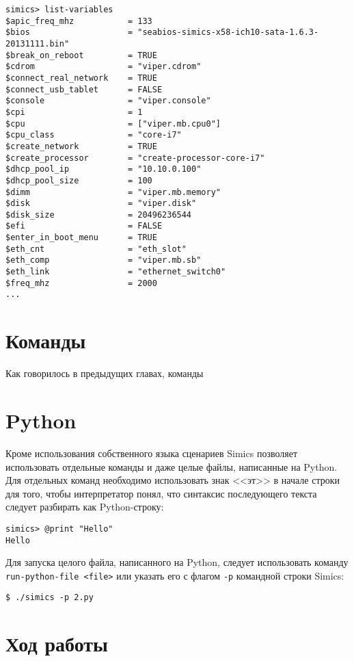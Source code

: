 \begin{lstlisting}
simics> list-variables
$apic_freq_mhz           = 133
$bios                    = "seabios-simics-x58-ich10-sata-1.6.3-20131111.bin"
$break_on_reboot         = TRUE
$cdrom                   = "viper.cdrom"
$connect_real_network    = TRUE
$connect_usb_tablet      = FALSE
$console                 = "viper.console"
$cpi                     = 1
$cpu                     = ["viper.mb.cpu0"]
$cpu_class               = "core-i7"
$create_network          = TRUE
$create_processor        = "create-processor-core-i7"
$dhcp_pool_ip            = "10.10.0.100"
$dhcp_pool_size          = 100
$dimm                    = "viper.mb.memory"
$disk                    = "viper.disk"
$disk_size               = 20496236544
$efi                     = FALSE
$enter_in_boot_menu      = TRUE
$eth_cnt                 = "eth_slot"
$eth_comp                = "viper.mb.sb"
$eth_link                = "ethernet_switch0"
$freq_mhz                = 2000
...
\end{lstlisting}

\section{Команды}

Как говорилось в предыдущих главах, команды 

\todo

\section{Python}

Кроме использования собственного языка сценариев Simics позволяет использовать отдельные команды и даже целые файлы, написанные на Python. Для отдельных команд необходимо использовать знак <<эт>>  в начале строки для того, чтобы интерпретатор понял, что синтаксис последующего текста следует разбирать как Python-строку:
\begin{lstlisting}
simics> @print "Hello"
Hello
\end{lstlisting}

Для запуска целого файла, написанного на Python, следует использовать команду \texttt{run-python-file <file>} или указать его с флагом \texttt{-p} командной строки Simics:
\begin{lstlisting}
$ ./simics -p 2.py
\end{lstlisting}

\section{Ход работы}

